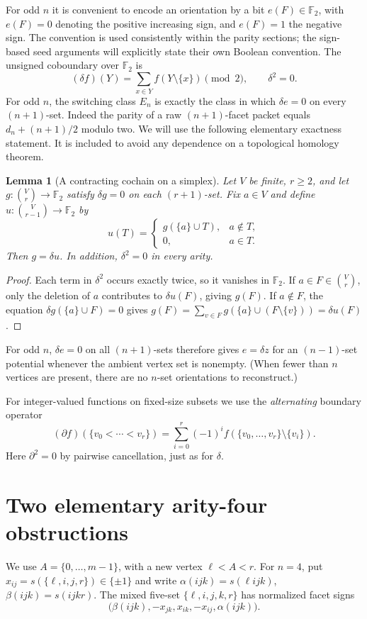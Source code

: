 \documentclass[11pt,a4paper]{article}
\newtheorem{lemma}[theorem]{Lemma}
\theoremstyle{remark}
\newcommand{\F}{\mathbb F_2}
\begin{document}
For odd $n$ it is convenient to encode an orientation by a bit
$e(F)\in\F$, with $e(F)=0$ denoting the positive increasing sign, and
$e(F)=1$ the negative sign.  The convention is used consistently within
the parity sections; the sign-based seed arguments will explicitly state
their own Boolean convention.  The unsigned coboundary over $\F$ is
\[
 (\delta f)(Y)=\sum_{x\in Y}f(Y\setminus\{x\})\pmod2,
\qquad \delta^2=0.
\]
For odd $n$, the switching class $E_n$ is exactly the class in which
$\delta e=0$ on every $(n+1)$-set.  Indeed the parity of a raw
$(n+1)$-facet packet equals $d_n+(n+1)/2$ modulo two.  We will use the following elementary exactness statement. It is
included to avoid any dependence on a topological homology theorem.

\begin{lemma}[A contracting cochain on a simplex]\label{lem:exactness}
Let $V$ be finite, $r\ge2$, and let
$g:\binom V r\to\mathbb F_2$ satisfy $\delta g=0$ on each
$(r+1)$-set. Fix $a\in V$ and define
$u:\binom V{r-1}\to\mathbb F_2$ by
\[
 u(T)=\begin{cases}g(\{a\}\cup T),&a\notin T,\\0,&a\in T.\end{cases}
\]
Then $g=\delta u$. In addition, $\delta^2=0$ in every arity.
\end{lemma}
\begin{proof}
Each term in $\delta^2$ occurs exactly twice, so it vanishes in
$\mathbb F_2$. If $a\in F\in\binom Vr$, only the deletion of $a$
contributes to $\delta u(F)$, giving $g(F)$. If $a\notin F$,
the equation $\delta g(\{a\}\cup F)=0$ gives
$g(F)=\sum_{v\in F}g(\{a\}\cup(F\setminus\{v\}))=\delta u(F)$.
\end{proof}

For odd $n$, $\delta e=0$ on all $(n+1)$-sets therefore gives
$e=\delta z$ for an $(n-1)$-set potential whenever the ambient
vertex set is nonempty. (When fewer than $n$ vertices are present,
there are no $n$-set orientations to reconstruct.)

For integer-valued functions on fixed-size subsets we use the
\emph{alternating} boundary operator
\[
 (\partial f)(\{v_0<\cdots<v_r\})
 =\sum_{i=0}^r(-1)^if(\{v_0,\ldots,v_r\}\setminus\{v_i\}).
\]
Here $\partial^2=0$ by pairwise cancellation, just as for $\delta$.

\section{Two elementary arity-four obstructions}\label{sec:arity4}
We use $A=\{0,\ldots,m-1\}$, with a new vertex $\ell<A<r$.
For $n=4$, put $x_{ij}=s(\{\ell,i,j,r\})\in\{\pm1\}$ and
write $\alpha(ijk)=s(\ell ijk)$, $\beta(ijk)=s(ijkr)$.
The mixed five-set $\{\ell,i,j,k,r\}$ has normalized facet signs
\begin{equation}\label{eq:4-packet}
 \bigl(\beta(ijk),-x_{jk},x_{ik},-x_{ij},\alpha(ijk)\bigr).
\end{equation}
\end{document}
